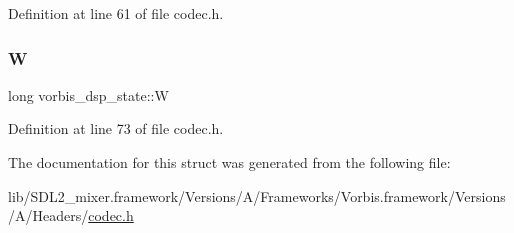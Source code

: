 Definition at line 61 of file codec.\+h.

\mbox{\label{structvorbis__dsp__state_a1cc3a520dcf831fb967341e5095c7b38}} 
\subsubsection{\texorpdfstring{W}{W}}
{\footnotesize\ttfamily long vorbis\+\_\+dsp\+\_\+state\+::W}



Definition at line 73 of file codec.\+h.



The documentation for this struct was generated from the following file\+:\begin{DoxyCompactItemize}
\item 
lib/\+S\+D\+L2\+\_\+mixer.\+framework/\+Versions/\+A/\+Frameworks/\+Vorbis.\+framework/\+Versions/\+A/\+Headers/\mbox{\hyperlink{codec_8h}{codec.\+h}}\end{DoxyCompactItemize}

